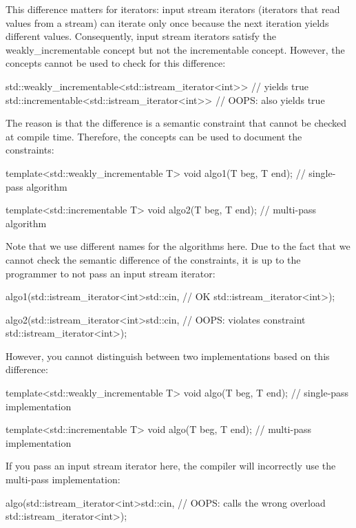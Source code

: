 This difference matters for iterators: input stream iterators (iterators that read values from a stream) can iterate only once because the next iteration yields different values. Consequently, input stream iterators satisfy the weakly\_incrementable concept but not the incrementable concept. However, the concepts cannot be used to check for this difference:

\begin{cpp}
std::weakly_incrementable<std::istream_iterator<int>> // yields true
std::incrementable<std::istream_iterator<int>> // OOPS: also yields true
\end{cpp}

The reason is that the difference is a semantic constraint that cannot be checked at compile time. Therefore, the concepts can be used to document the constraints:

\begin{cpp}
template<std::weakly_incrementable T>
void algo1(T beg, T end); // single-pass algorithm

template<std::incrementable T>
void algo2(T beg, T end); // multi-pass algorithm
\end{cpp}

Note that we use different names for the algorithms here. Due to the fact that we cannot check the semantic difference of the constraints, it is up to the programmer to not pass an input stream iterator:

\begin{cpp}
algo1(std::istream_iterator<int>{std::cin}, // OK
	  std::istream_iterator<int>{});

algo2(std::istream_iterator<int>{std::cin}, // OOPS: violates constraint
	  std::istream_iterator<int>{});
\end{cpp}

However, you cannot distinguish between two implementations based on this difference:

\begin{cpp}
template<std::weakly_incrementable T>
void algo(T beg, T end); // single-pass implementation

template<std::incrementable T>
void algo(T beg, T end); // multi-pass implementation
\end{cpp}

If you pass an input stream iterator here, the compiler will incorrectly use the multi-pass implementation:

\begin{cpp}
algo(std::istream_iterator<int>{std::cin}, // OOPS: calls the wrong overload
	 std::istream_iterator<int>{});
\end{cpp}

